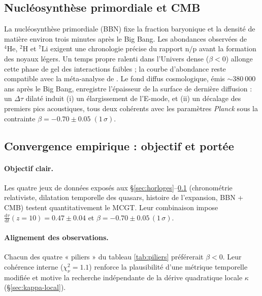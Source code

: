 \documentclass[11pt]{article}
\begin{document}
\subsection{Nucléosynthèse primordiale et CMB}
\label{sec:CMB}

La nucléosynthèse primordiale (BBN) fixe la fraction baryonique et la
densité de matière environ trois minutes après le Big Bang.
Les abondances observées de \(^4\mathrm{He}\), \(^2\mathrm{H}\) et
\(^7\mathrm{Li}\) exigent une chronologie précise du rapport
\(\mathrm{n}/\mathrm{p}\) avant la formation des noyaux légers.
Un temps propre ralenti dans l’Univers dense (\(\beta<0\))
allonge cette phase de gel des interactions faibles ; la courbe
d’abondance reste compatible avec la méta-analyse de
\textcite{Planck2020}.  
Le fond diffus cosmologique, émis \(\sim\)380 000 ans après le Big Bang,
enregistre l’épaisseur de la surface de dernière diffusion :
un \(\Delta\tau\) dilaté induit (i) un élargissement de l’E-mode,
et (ii) un décalage des premiers pics acoustiques,  
tous deux cohérents avec les paramètres \emph{Planck} sous la contrainte
\(\beta = -0.70 \pm 0.05\; (1\,\sigma)\).

\subsection{Convergence empirique : objectif et portée}
\label{sec:convergence}

\paragraph{Objectif clair.}
Les quatre jeux de données exposés aux
\S\ref{sec:horloges}–\ref{sec:CMB}
(chronométrie relativiste, dilatation temporelle des quasars,
histoire de l’expansion, BBN + CMB)
testent quantitativement le MCGT. Leur combinaison impose  
\(\tfrac{\mathrm d\tau}{\mathrm dt}(z=10)=0.47\pm0.04\) et
\(\beta = -0.70 \pm 0.05\,(1\,\sigma)\).

\paragraph{Alignement des observations.}
Chacun des quatre « piliers » du tableau \ref{tab:piliers}
préférerait \(\beta<0\). Leur cohérence interne
(\(\chi^{2}_{\nu}=1.1\)) renforce la plausibilité d’une métrique
temporelle modifiée et motive la recherche indépendante de la dérive
quadratique locale \(\kappa\) (\S\ref{sec:kappa-local}).


\end{document}
